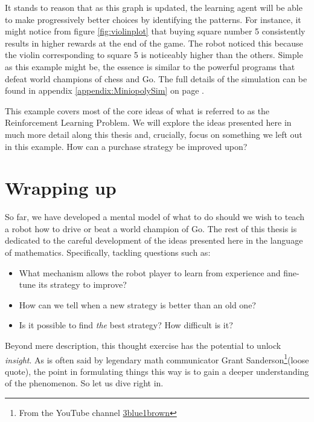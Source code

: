 It stands to reason that as this graph is updated, the learning agent will be
able to make progressively better choices by identifying the patterns. For
instance, it might notice from figure \ref{fig:violinplot} that buying square
number 5 consistently results in higher rewards at the end of the game. The
robot noticed this because the violin corresponding to square 5 is noticeably
higher than the others. Simple as this example might be, the essence is similar
to the powerful programs that defeat world champions of chess and Go. The full
details of the simulation can be found in appendix
\ref{appendix:MiniopolySim} on page
\pageref{appendix:MiniopolySim}.

This example covers most of the core ideas of what is referred to as the
Reinforcement Learning Problem. We will explore the ideas presented here in much
more detail along this thesis and, crucially, focus on something we left out in
this example. How can a purchase strategy be improved upon?

\section{Wrapping up}
So far, we have developed a mental model of what to do should we wish to teach a
robot how to drive or beat a world champion of Go. The rest of this thesis is
dedicated to the careful development of the ideas presented here in the language
of mathematics. Specifically, tackling questions such as:
\begin{itemize}
	\item What mechanism allows the robot player to learn from experience and
		fine-tune its strategy to improve?
	\item How can we tell when a new strategy is better than an old one?
	\item Is it possible to find \textit{the} best strategy?  How difficult is
		it?
\end{itemize}

Beyond mere description, this thought exercise has the potential to unlock
\textit{insight}. As is often said by legendary math communicator Grant
Sanderson\footnote{From the YouTube channel
\href{https://www.youtube.com/channel/UCYO_jab_esuFRV4b17AJtAw}{3blue1brown}}(loose
quote), the point in formulating things this way is to gain a deeper
understanding of the phenomenon. So let us dive right in.